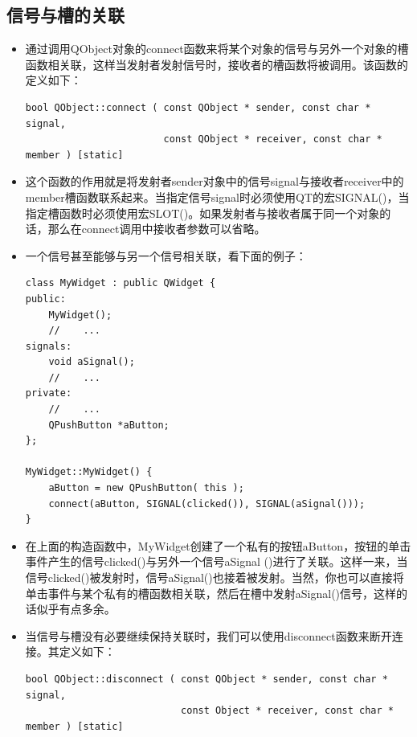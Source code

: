 \documentclass[9pt,b5paper]{article}
\begin{document}
\subsection{信号与槽的关联}
\label{sec-1-4}
\begin{itemize}
\item 通过调用QObject对象的connect函数来将某个对象的信号与另外一个对象的槽函数相关联，这样当发射者发射信号时，接收者的槽函数将被调用。该函数的定义如下：
\lstset{language=java,label= ,caption= ,numbers=none}
\begin{lstlisting}
bool QObject::connect ( const QObject * sender, const char * signal,  
                        const QObject * receiver, const char * member ) [static]
\end{lstlisting}

\item 这个函数的作用就是将发射者sender对象中的信号signal与接收者receiver中的member槽函数联系起来。当指定信号signal时必须使用QT的宏SIGNAL()，当指定槽函数时必须使用宏SLOT()。如果发射者与接收者属于同一个对象的话，那么在connect调用中接收者参数可以省略。
\item 一个信号甚至能够与另一个信号相关联，看下面的例子：

\lstset{language=java,label= ,caption= ,numbers=none}
\begin{lstlisting}
class MyWidget : public QWidget {  
public:  
    MyWidget();  
    //    ...  
signals:  
    void aSignal();  
    //    ...  
private:  
    //    ...  
    QPushButton *aButton;  
};  

MyWidget::MyWidget() {  
    aButton = new QPushButton( this );  
    connect(aButton, SIGNAL(clicked()), SIGNAL(aSignal()));  
}
\end{lstlisting}

\item 在上面的构造函数中，MyWidget创建了一个私有的按钮aButton，按钮的单击事件产生的信号clicked()与另外一个信号aSignal ()进行了关联。这样一来，当信号clicked()被发射时，信号aSignal()也接着被发射。当然，你也可以直接将单击事件与某个私有的槽函数相关联，然后在槽中发射aSignal()信号，这样的话似乎有点多余。
\item 当信号与槽没有必要继续保持关联时，我们可以使用disconnect函数来断开连接。其定义如下：
\lstset{language=java,label= ,caption= ,numbers=none}
\begin{lstlisting}
bool QObject::disconnect ( const QObject * sender, const char * signal,  
                           const Object * receiver, const char * member ) [static]
\end{lstlisting}


\end{itemize}
\end{document}
